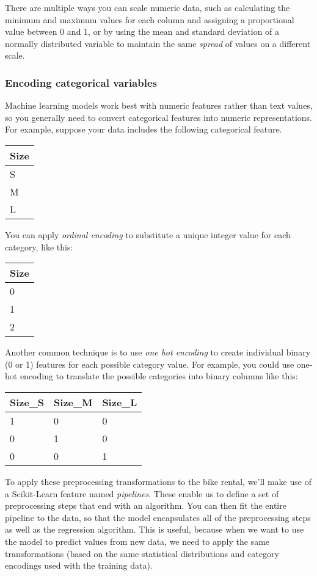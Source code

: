 \documentclass[11pt]{article}
\begin{document}
There are multiple ways you can scale numeric data, such as calculating
the minimum and maximum values for each column and assigning a
proportional value between 0 and 1, or by using the mean and standard
deviation of a normally distributed variable to maintain the same
\emph{spread} of values on a different scale.

\hypertarget{encoding-categorical-variables}{%
\subsubsection{Encoding categorical
variables}\label{encoding-categorical-variables}}

Machine learning models work best with numeric features rather than text
values, so you generally need to convert categorical features into
numeric representations. For example, suppose your data includes the
following categorical feature.

\begin{longtable}[]{@{}l@{}}
\toprule
Size\tabularnewline
\midrule
\endhead
S\tabularnewline
M\tabularnewline
L\tabularnewline
\bottomrule
\end{longtable}

You can apply \emph{ordinal encoding} to substitute a unique integer
value for each category, like this:

\begin{longtable}[]{@{}l@{}}
\toprule
Size\tabularnewline
\midrule
\endhead
0\tabularnewline
1\tabularnewline
2\tabularnewline
\bottomrule
\end{longtable}

Another common technique is to use \emph{one hot encoding} to create
individual binary (0 or 1) features for each possible category value.
For example, you could use one-hot encoding to translate the possible
categories into binary columns like this:

\begin{longtable}[]{@{}lll@{}}
\toprule
Size\_S & Size\_M & Size\_L\tabularnewline
\midrule
\endhead
1 & 0 & 0\tabularnewline
0 & 1 & 0\tabularnewline
0 & 0 & 1\tabularnewline
\bottomrule
\end{longtable}

To apply these preprocessing transformations to the bike rental, we'll
make use of a Scikit-Learn feature named \emph{pipelines}. These enable
us to define a set of preprocessing steps that end with an algorithm.
You can then fit the entire pipeline to the data, so that the model
encapsulates all of the preprocessing steps as well as the regression
algorithm. This is useful, because when we want to use the model to
predict values from new data, we need to apply the same transformations
(based on the same statistical distributions and category encodings used
with the training data).
\end{document}
